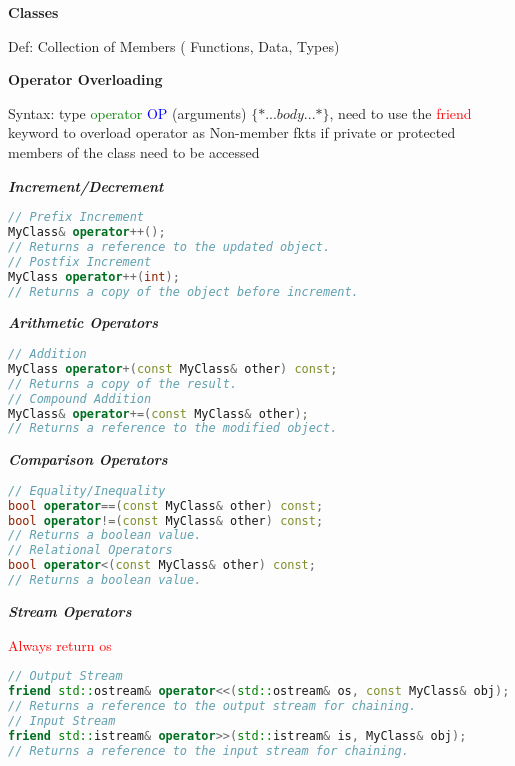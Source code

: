 \documentclass[fontsize=8pt, a4paper, landscape, fleqn]{scrartcl}
\renewcommand{\section}[1]{%
    \noindent\colorbox{sectioncolor}{%
        \parbox{\dimexpr\columnwidth-2\fboxsep}{\color{white}\textbf{#1}}}%
    \vspace{0.5mm}%
}
\renewcommand{\subsection}[1]{%
    \noindent\colorbox{subsectioncolor}{%
        \parbox{\dimexpr\columnwidth-2\fboxsep}{\color{white}\textbf{#1}}}%
    \vspace{0.5mm}%
}
\renewcommand{\subsubsection}[1]{%
    \noindent\textbf{\textit{\color{subsectioncolor}#1}}%
    \vspace{1mm}%
}
\begin{document}
\begin{multicols*}{3}[\raggedcolumns]
    \section{Classes}
    Def: Collection of Members ( Functions, Data, Types)
    
    \subsection{Operator Overloading}
Syntax: type \textcolor{green}{operator} \textcolor{blue}{OP} (arguments) $\{ *...body...*\}$, need to use the \textcolor{red}{friend} keyword to overload operator as Non-member fkts if private or protected members of the class need to be accessed 

\subsubsection{Increment/Decrement}
\begin{lstlisting}[language=C++]
// Prefix Increment
MyClass& operator++(); 
// Returns a reference to the updated object.
// Postfix Increment
MyClass operator++(int);
// Returns a copy of the object before increment.
\end{lstlisting}

\subsubsection{Arithmetic Operators}
\begin{lstlisting}[language=C++]
// Addition
MyClass operator+(const MyClass& other) const;
// Returns a copy of the result.
// Compound Addition
MyClass& operator+=(const MyClass& other);
// Returns a reference to the modified object.
\end{lstlisting}

\subsubsection{Comparison Operators}
\begin{lstlisting}[language=C++]
// Equality/Inequality
bool operator==(const MyClass& other) const;
bool operator!=(const MyClass& other) const;
// Returns a boolean value.
// Relational Operators
bool operator<(const MyClass& other) const;
// Returns a boolean value.
\end{lstlisting}

\subsubsection{Stream Operators}
\textcolor{red}{Always return os}
\begin{lstlisting}[language=C++]
// Output Stream
friend std::ostream& operator<<(std::ostream& os, const MyClass& obj);
// Returns a reference to the output stream for chaining.
// Input Stream
friend std::istream& operator>>(std::istream& is, MyClass& obj);
// Returns a reference to the input stream for chaining.
\end{lstlisting}


\end{multicols*}
\end{document}
